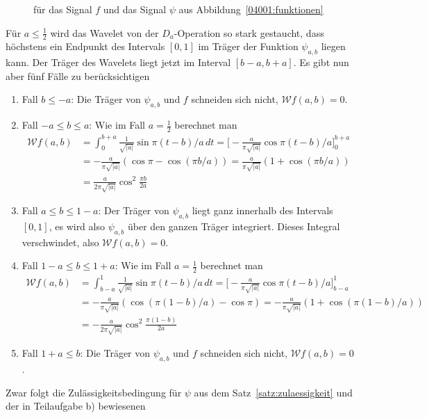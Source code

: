 \begin{loesung}
\begin{teilaufgaben}
\begin{figure}
{für das Signal $f$ und das Signal $\psi$ aus Abbildung~\ref{04001:funktionen}
\label{04001:wavelet2}}
\end{figure}
%
%
\item
Für $a\le\frac12$ wird das Wavelet von der $D_a$-Operation so stark gestaucht,
dass höchstens ein Endpunkt des Intervals $[0,1]$ im Träger der Funktion
$\psi_{a,b}$ liegen kann.
Der Träger des Wavelets liegt jetzt im Interval $[b-a,b+a]$.
Es gibt nun aber fünf Fälle zu berücksichtigen
\begin{enumerate}
\item Fall $b\le -a$:
Die Träger von $\psi_{a,b}$ und $f$ schneiden
sich nicht, $\mathcal{W}f(a,b)=0$.
\item Fall $-a\le b \le a$:
Wie im Fall $a=\frac12$ berechnet man
\begin{align*}
\mathcal{W}f(a,b)
&=
\int_{0}^{b+a} \frac{1}{\sqrt{|a|}} \sin \pi(t-b)/a\,dt
=
\biggl[
-
\frac{a}{\pi\sqrt{|a|}}
\cos \pi(t-b)/a
\biggr]_0^{b+a}
\\
&=
-\frac{a}{\pi\sqrt{|a|}}(\cos\pi - \cos(\pi b/a))
=
\frac{a}{\pi\sqrt{|a|}}(1+\cos(\pi b/a))
\\
&=
\frac{a}{2\pi\sqrt{|a|}}\cos^2\frac{\pi b}{2a}
\end{align*}
\item Fall $a\le b \le 1-a$:
Der Träger von $\psi_{a,b}$ liegt ganz innerhalb des Intervals $[0,1]$,
es wird also $\psi_{a,b}$ über den ganzen Träger integriert.
Dieses Integral verschwindet, also 
$\mathcal{W}f(a,b)=0$.
\item Fall $1-a\le b \le 1 +a$:
Wie im Fall $a=\frac12$ berechnet man
\begin{align*}
\mathcal{W}f(a,b)
&=
\int_{b-a}^{1} \frac{1}{\sqrt{|a|}} \sin \pi(t-b)/a\,dt
=
\biggl[
-
\frac{a}{\pi\sqrt{|a|}}
\cos \pi(t-b)/a
\biggr]_{b-a}^1
\\
&=
-\frac{a}{\pi\sqrt{|a|}}(
\cos(\pi (1-b)/a)
-
\cos\pi 
)
=
-\frac{a}{\pi\sqrt{|a|}}(1+\cos(\pi(1- b)/a))
\\
&=
-\frac{a}{2\pi\sqrt{|a|}}\cos^2\frac{\pi(1- b)}{2a}
\end{align*}
\item Fall $1+a\le b$:
Die Träger von $\psi_{a,b}$ und $f$ schneiden
sich nicht, $\mathcal{W}f(a,b)=0$.
\end{enumerate}
%
%
\item
%
%
\item
Zwar folgt die Zulässigkeitsbedingung für $\psi$ aus dem
Satz~\ref{satz:zulaessigkeit} und der in Teilaufgabe b) bewiesenen

\end{teilaufgaben}
\end{loesung}
